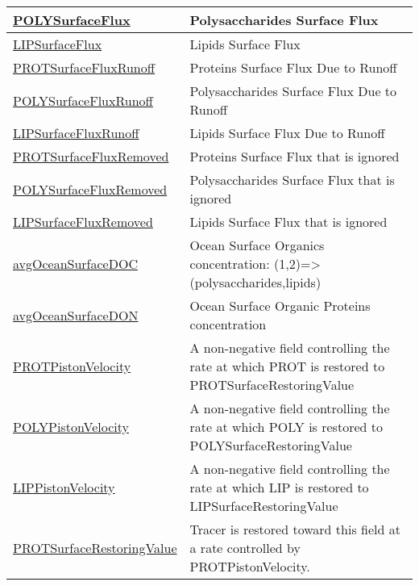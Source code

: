 {\begin{center}
\begin{longtable}{| p{2.0in} | p{4.0in} |}
    \hyperref[subsec:var_sec_forcing_POLYSurfaceFlux]{POLYSurfaceFlux} & Polysaccharides Surface Flux \\
    \hline
    \hyperref[subsec:var_sec_forcing_LIPSurfaceFlux]{LIPSurfaceFlux} & Lipids Surface Flux \\
    \hline
    \hyperref[subsec:var_sec_forcing_PROTSurfaceFluxRunoff]{PROTSurfaceFluxRunoff} & Proteins Surface Flux Due to Runoff \\
    \hline
    \hyperref[subsec:var_sec_forcing_POLYSurfaceFluxRunoff]{POLYSurfaceFluxRunoff} & Polysaccharides Surface Flux Due to Runoff \\
    \hline
    \hyperref[subsec:var_sec_forcing_LIPSurfaceFluxRunoff]{LIPSurfaceFluxRunoff} & Lipids Surface Flux Due to Runoff \\
    \hline
    \hyperref[subsec:var_sec_forcing_PROTSurfaceFluxRemoved]{PROTSurfaceFluxRemoved} & Proteins Surface Flux that is ignored \\
    \hline
    \hyperref[subsec:var_sec_forcing_POLYSurfaceFluxRemoved]{POLYSurfaceFluxRemoved} & Polysaccharides Surface Flux that is ignored \\
    \hline
    \hyperref[subsec:var_sec_forcing_LIPSurfaceFluxRemoved]{LIPSurfaceFluxRemoved} & Lipids Surface Flux that is ignored \\
    \hline
    \hyperref[subsec:var_sec_forcing_avgOceanSurfaceDOC]{avgOceanSurfaceDOC} & Ocean Surface Organics concentration: (1,2)=>(polysaccharides,lipids) \\
    \hline
    \hyperref[subsec:var_sec_forcing_avgOceanSurfaceDON]{avgOceanSurfaceDON} & Ocean Surface Organic Proteins concentration \\
    \hline
    \hyperref[subsec:var_sec_forcing_PROTPistonVelocity]{PROTPistonVelocity} & A non-negative field controlling the rate at which PROT is restored to PROTSurfaceRestoringValue \\
    \hline
    \hyperref[subsec:var_sec_forcing_POLYPistonVelocity]{POLYPistonVelocity} & A non-negative field controlling the rate at which POLY is restored to POLYSurfaceRestoringValue \\
    \hline
    \hyperref[subsec:var_sec_forcing_LIPPistonVelocity]{LIPPistonVelocity} & A non-negative field controlling the rate at which LIP is restored to LIPSurfaceRestoringValue \\
    \hline
    \hyperref[subsec:var_sec_forcing_PROTSurfaceRestoringValue]{PROTSurfaceRestoringValue} & Tracer is restored toward this field at a rate controlled by PROTPistonVelocity. \\

\end{longtable}
\end{center}}
